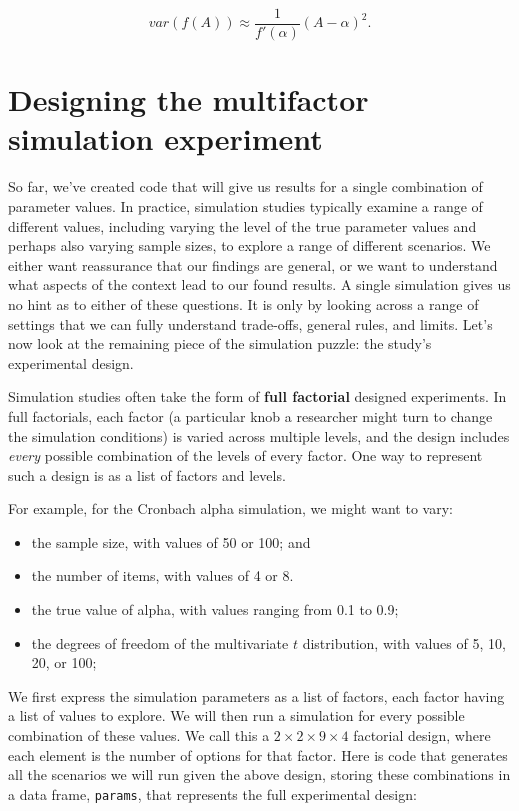 \documentclass[
]{book}
\providecommand{\tightlist}{%
  \setlength{\itemsep}{0pt}\setlength{\parskip}{0pt}}
\begin{document}
\[ var( f(A) ) \approx \frac{1}{f'(\alpha)} (A - \alpha)^2 . \]

\hypertarget{exp_design}{%
\chapter{Designing the multifactor simulation experiment}\label{exp_design}}

So far, we've created code that will give us results for a single combination of parameter values.
In practice, simulation studies typically examine a range of different values, including varying the level of the true parameter values and perhaps also varying sample sizes, to explore a range of different scenarios.
We either want reassurance that our findings are general, or we want to understand what aspects of the context lead to our found results.
A single simulation gives us no hint as to either of these questions.
It is only by looking across a range of settings that we can fully understand trade-offs, general rules, and limits.
Let's now look at the remaining piece of the simulation puzzle: the study's experimental design.

Simulation studies often take the form of \textbf{full factorial} designed experiments. In full factorials, each factor (a particular knob a researcher might turn to change the simulation conditions) is varied across multiple levels, and the design includes \emph{every} possible combination of the levels of every factor. One way to represent such a design is as a list of factors and levels.

For example, for the Cronbach alpha simulation, we might want to vary:

\begin{itemize}
\tightlist
\item
  the sample size, with values of 50 or 100; and
\item
  the number of items, with values of 4 or 8.
\item
  the true value of alpha, with values ranging from 0.1 to 0.9;
\item
  the degrees of freedom of the multivariate \(t\) distribution, with values of 5, 10, 20, or 100;
\end{itemize}

We first express the simulation parameters as a list of factors, each factor having a list of values to explore.
We will then run a simulation for every possible combination of these values.
We call this a \(2 \times 2 \times 9 \times 4\) factorial design, where each element is the number of options for that factor.
Here is code that generates all the scenarios we will run given the above design, storing these combinations in a data frame, \texttt{params}, that represents the full experimental design:
\end{document}
